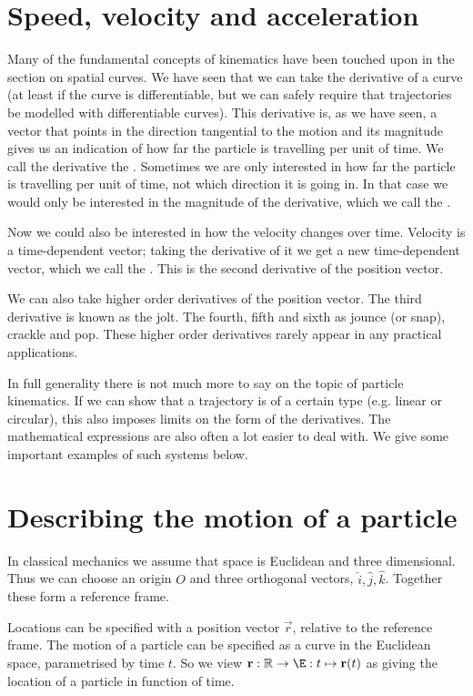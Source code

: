 \section{Speed, velocity and acceleration}
Many of the fundamental concepts of kinematics have been touched upon in the section on spatial curves. We have seen that we can take the derivative of a curve (at least if the curve is differentiable, but we can safely require that trajectories be modelled with differentiable curves). This derivative is, as we have seen, a vector that points in the direction tangential to the motion and its magnitude gives us an indication of how far the particle is travelling per unit of time. We call the derivative the . Sometimes we are only interested in how far the particle is travelling per unit of time, not which direction it is going in. In that case we would only be interested in the magnitude of the derivative, which we call the .

Now we could also be interested in how the velocity changes over time. Velocity is a time-dependent vector; taking the derivative of it we get a new time-dependent vector, which we call the . This is the second derivative of the position vector.

We can also take higher order derivatives of the position vector. The third derivative is known as the jolt. The fourth, fifth and sixth as jounce (or snap), crackle and pop. These higher order derivatives rarely appear in any practical applications.

In full generality there is not much more to say on the topic of particle kinematics. If we can show that a trajectory is of a certain type (e.g. linear or circular), this also imposes limits on the form of the derivatives. The mathematical expressions are also often a lot easier to deal with. We give some important examples of such systems below.

\section{Describing the motion of a particle}
In classical mechanics we assume that space is Euclidean and three dimensional. Thus we can choose an origin $O$ and three orthogonal vectors, $\hat{i}, \hat{j}, \hat{k}$. Together these form a reference frame.

Locations can be specified with a position vector $\vec{r}$, relative to the reference frame. The motion of a particle can be specified as a curve in the Euclidean space, parametrised by time $t$. So we view $\vec{r}: \R \to \E: t\mapsto \vec{r}(t)$ as giving the location of a particle in function of time.

